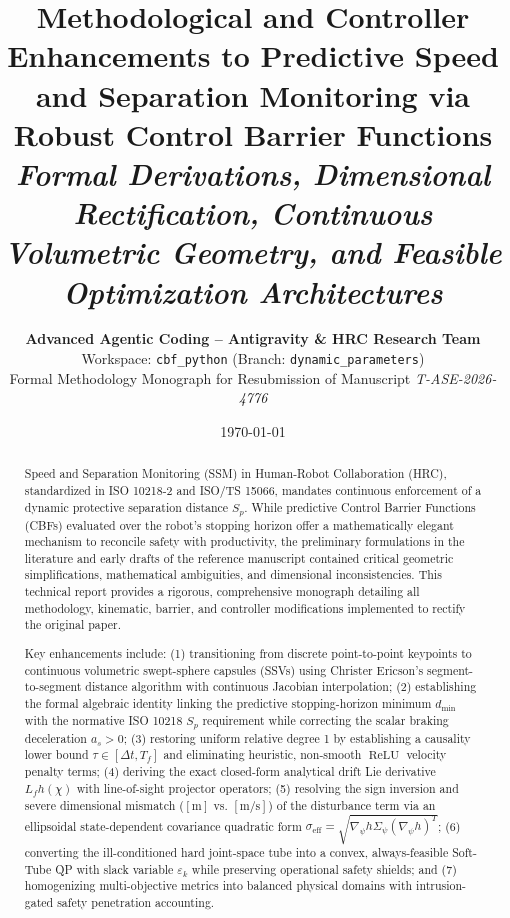 \documentclass[10pt,twocolumn,a4paper]{article}
\begin{document}
\title{\LARGE \textbf{Methodological and Controller Enhancements to Predictive Speed and Separation Monitoring via Robust Control Barrier Functions}\\[0.3em]
\large \textit{Formal Derivations, Dimensional Rectification, Continuous Volumetric Geometry, and Feasible Optimization Architectures}}

\author{
    \textbf{Advanced Agentic Coding -- Antigravity \& HRC Research Team}\\
    \small Workspace: \texttt{cbf\_python} (Branch: \texttt{dynamic\_parameters})\\
    \small Formal Methodology Monograph for Resubmission of Manuscript \textit{T-ASE-2026-4776}
}

\date{\small \today}

\maketitle

\begin{abstract}
Speed and Separation Monitoring (SSM) in Human-Robot Collaboration (HRC), standardized in ISO 10218-2 and ISO/TS 15066, mandates continuous enforcement of a dynamic protective separation distance $S_p$. While predictive Control Barrier Functions (CBFs) evaluated over the robot's stopping horizon offer a mathematically elegant mechanism to reconcile safety with productivity, the preliminary formulations in the literature and early drafts of the reference manuscript contained critical geometric simplifications, mathematical ambiguities, and dimensional inconsistencies. This technical report provides a rigorous, comprehensive monograph detailing all methodology, kinematic, barrier, and controller modifications implemented to rectify the original paper. 

Key enhancements include: (1) transitioning from discrete point-to-point keypoints to continuous volumetric swept-sphere capsules (SSVs) using Christer Ericson's segment-to-segment distance algorithm with continuous Jacobian interpolation; (2) establishing the formal algebraic identity linking the predictive stopping-horizon minimum $d_{\min}$ with the normative ISO 10218 $S_p$ requirement while correcting the scalar braking deceleration $a_s > 0$; (3) restoring uniform relative degree 1 by establishing a causality lower bound $\tau \in [\Delta t, T_f]$ and eliminating heuristic, non-smooth $\operatorname{ReLU}$ velocity penalty terms; (4) deriving the exact closed-form analytical drift Lie derivative $L_f h(\chi)$ with line-of-sight projector operators; (5) resolving the sign inversion and severe dimensional mismatch ($[\text{m}]$ vs. $[\text{m/s}]$) of the disturbance term via an ellipsoidal state-dependent covariance quadratic form $\sigma_{\text{eff}} = \sqrt{\nabla_\psi h \Sigma_\psi (\nabla_\psi h)^T}$; (6) converting the ill-conditioned hard joint-space tube into a convex, always-feasible Soft-Tube QP with slack variable $\varepsilon_k$ while preserving operational safety shields; and (7) homogenizing multi-objective metrics into balanced physical domains with intrusion-gated safety penetration accounting.
\end{abstract}
\end{document}
